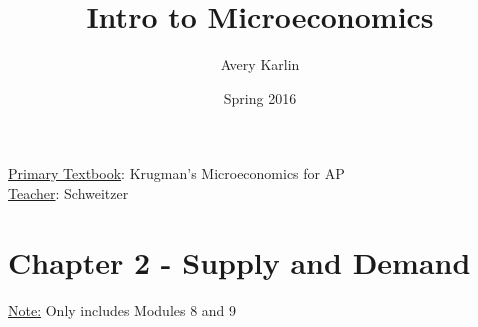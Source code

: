 \documentclass[11 pt, twoside]{article}
\begin{document}
\title{Intro to Microeconomics}
\author{Avery Karlin}
\date{Spring 2016}
\newcommand{\textbook}{Krugman's Microeconomics for AP}
\newcommand{\teacher}{Schweitzer}

\maketitle
\newpage
\hypertarget{content}{\tableofcontents}
\vspace{11pt}
\noindent
\underline{Primary Textbook}: \textbook\\
\underline{Teacher}: \teacher
\newpage

\section{Chapter 2 - Supply and Demand}
\underline{Note:} Only includes Modules 8 and 9
\end{document}
